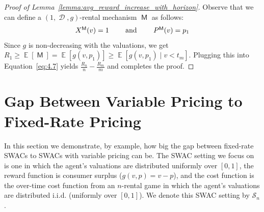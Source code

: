 \documentclass[11pt,letterpaper]{article}
\newcommand{\fr}{fixed-rate\xspace}
\newcommand{\swac}{SWAC\xspace}
\newcommand{\swacs}{SWACs\xspace}
\DeclareMathOperator*{\E}{\bb{E}}
\newcommand{\bb}[1]{\mathbb{#1}}
\DeclareMathOperator{\D}{\mathcal{D}}
\DeclareMathOperator{\M}{\mech{M}}
\renewcommand{\S}{\mathcal{S}}
\newcommand{\g}{g}
\theoremstyle{plain}
\newcommand{\mech}[1]{\mathsf{#1}}
\begin{document}
\begin{proof}[Proof of Lemma~\ref{lemma:avg_reward_increase_with_horizon}]
    Observe that we can define a $(1,\D,\g)$-rental mechanism $\M$ as follows:
    \begin{align*}
        \x[\M]{v}=1\ \ \ \ \ \ \textnormal{ and }\ \ \ \ \ \ \p[\M]{v}=p_1
    \end{align*}
    Since $\g$ is non-decreasing with the valuations, we get $R_1\geq\E[\M]=\E[\g(v,p_1)]\geq\E[\g(v,p_1)\mid v<t_m]$. Plugging this into Equation~\ref{eq:4.7} yields $\frac{R_n}{n}-\frac{R_m}{m}$ and completes the proof.
\end{proof}

\section{Gap Between Variable Pricing to Fixed-Rate Pricing}\label{sec:fr-gap}

In this section we demonstrate, by example, how big the gap between \fr \swacs to \swacs with variable pricing can be.
The \swac setting we focus on is one in which the agent's valuations are distributed uniformly over $[0,1]$, the reward function is consumer surplus ($\g(v,p)=v-p$), and the cost function is the over-time cost function from an $n$-rental game in which the agent's valuations are distributed i.i.d. (uniformly over $[0,1]$). We denote this \swac setting by $\S_n$. 
\end{document}
